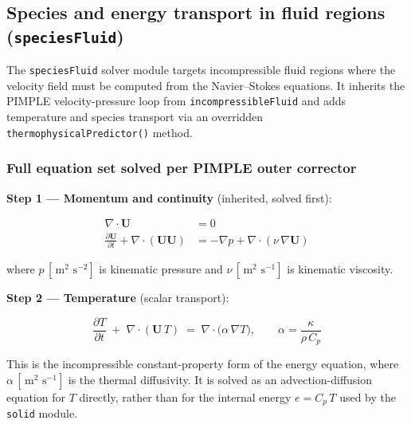 \documentclass[11pt,a4paper]{article}
\newcommand{\pder}[2]{\frac{\partial #1}{\partial #2}}
\newcommand{\m}{\,\text{m}}
\newcommand{\s}{\,\text{s}}
\begin{document}
\subsection{Species and energy transport in fluid regions (\texttt{speciesFluid})}
\label{sec:fluid}

The \texttt{speciesFluid} solver module targets incompressible fluid regions
where the velocity field must be computed from the Navier--Stokes equations.
It inherits the PIMPLE velocity-pressure loop from \texttt{incompressibleFluid}
and adds temperature and species transport via an overridden
\texttt{thermophysicalPredictor()} method.

\subsubsection{Full equation set solved per PIMPLE outer corrector}

\textbf{Step 1 — Momentum and continuity} (inherited, solved first):

\begin{tcolorbox}[eqbox,title={Incompressible Navier--Stokes}]
\begin{align}
  \nabla\cdot\mathbf{U} &= 0 \label{eq:cont} \\[4pt]
  \pder{\mathbf{U}}{t}
    + \nabla\cdot(\mathbf{U}\mathbf{U})
  &= -\nabla p + \nabla\cdot(\nu\,\nabla\mathbf{U}) \label{eq:mom}
\end{align}
\end{tcolorbox}

where $p\,[\m^2\,\s^{-2}]$ is kinematic pressure and $\nu\,[\m^2\,\s^{-1}]$
is kinematic viscosity.

\textbf{Step 2 — Temperature} (scalar transport):

\begin{tcolorbox}[eqbox,title={Energy equation — \texttt{speciesFluid} regions}]
\begin{equation}\label{eq:fluid_T}
  \pder{T}{t}
  \;+\; \nabla\cdot(\mathbf{U}\,T)
  \;=\; \nabla\cdot\!\bigl(\alpha\,\nabla T\bigr),
  \qquad
  \alpha = \frac{\kappa}{\rho\,C_p}
\end{equation}
\end{tcolorbox}

This is the incompressible constant-property form of the energy equation,
where $\alpha\,[\m^2\,\s^{-1}]$ is the thermal diffusivity.  It is solved as
an advection-diffusion equation for $T$ directly, rather than for the internal
energy $e = C_p\,T$ used by the \texttt{solid} module.
\end{document}
